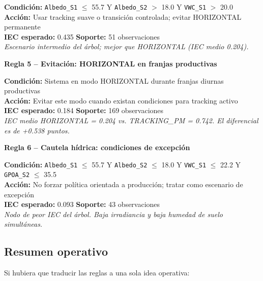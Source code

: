 \documentclass[12pt,a4paper]{article}
\begin{document}
\begin{reglabox}
\textbf{Condición:} \texttt{Albedo\_S1} $\leq$ 55.7 Y \texttt{Albedo\_S2} $>$ 18.0
    Y \texttt{VWC\_S1} $>$ 20.0 \\
\textbf{Acción:} Usar tracking suave o transición controlada; evitar HORIZONTAL permanente \\
\textbf{IEC esperado:} 0.435 \quad \textbf{Soporte:} 51 observaciones \\
\textit{Escenario intermedio del árbol; mejor que HORIZONTAL (IEC medio 0.204).}
\end{reglabox}

\vspace{0.3cm}
\noindent\textbf{Regla 5 -- Evitación: HORIZONTAL en franjas productivas}

\begin{reglabox}
\textbf{Condición:} Sistema en modo HORIZONTAL durante franjas diurnas productivas \\
\textbf{Acción:} Evitar este modo cuando existan condiciones para tracking activo \\
\textbf{IEC esperado:} 0.184 \quad \textbf{Soporte:} 169 observaciones \\
\textit{IEC medio HORIZONTAL = 0.204 vs. TRACKING\_PM = 0.742.
    El diferencial es de +0.538 puntos.}
\end{reglabox}

\vspace{0.3cm}
\noindent\textbf{Regla 6 -- Cautela hídrica: condiciones de excepción}

\begin{reglabox}
\textbf{Condición:} \texttt{Albedo\_S1} $\leq$ 55.7 Y \texttt{Albedo\_S2} $\leq$ 18.0
    Y \texttt{VWC\_S1} $\leq$ 22.2 Y \texttt{GPOA\_S2} $\leq$ 35.5 \\
\textbf{Acción:} No forzar política orientada a producción; tratar como escenario
    de excepción \\
\textbf{IEC esperado:} 0.093 \quad \textbf{Soporte:} 43 observaciones \\
\textit{Nodo de peor IEC del árbol. Baja irradiancia y baja humedad de suelo
    simultáneas.}
\end{reglabox}

\subsection{Resumen operativo}

Si hubiera que traducir las reglas a una sola idea operativa:
\end{document}
